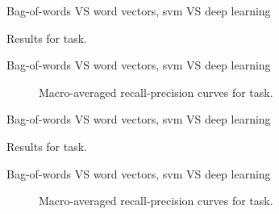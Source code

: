 \begin{frame}{Bag-of-words VS word vectors, \acs{svm} VS deep learning}
\begin{table}
  \centering
  \caption{Results for \type{} task.}
  \footnotesize
  
\end{table}
\end{frame}

\begin{frame}{Bag-of-words VS word vectors, \acs{svm} VS deep learning}
\begin{figure}
  \centering
  \resizebox{0.9\textwidth}{!}{}
  \caption{Macro-averaged recall-precision curves for \type{} task.}
\end{figure}

\end{frame}

\begin{frame}{Bag-of-words VS word vectors, \acs{svm} VS deep learning}
\begin{table}
  \centering
  \caption{Results for \behaviour{} task.}
  \footnotesize
  
\end{table}
\end{frame}

\begin{frame}{Bag-of-words VS word vectors, \acs{svm} VS deep learning}
\begin{figure}
  \centering
  \resizebox{0.9\textwidth}{!}{}
  \caption{Macro-averaged recall-precision curves for \behaviour{} task.}
\end{figure}

\end{frame}

%   


\backupend




